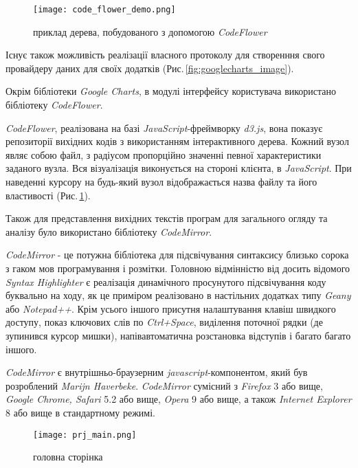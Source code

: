 \begin{figure}[h]
    \centering
    \texttt{[image: code\_flower\_demo.png]}
    \caption{приклад дерева, побудованого з допомогою {\it CodeFlower}}
    \label{fig:codeflower_demo_image}
\end{figure}

Існує також можливість реалізації власного протоколу для створенння свого провайдеру даних для своїх додатків (Рис.\,\ref{fig:googlecharts_image}).

Окрім бібліотеки {\itshape Google Charts}, в модулі інтерфейсу користувача використано бібліотеку {\itshape CodeFlower}.

{\itshape CodeFlower}, реалізована на базі {\itshape JavaScript}-фреймворку {\itshape d3.js}, вона показує репозиторії вихідних кодів з використанням інтерактивного дерева. Кожний вузол являє собою файл, з радіусом пропорційно значенні певної характеристики заданого вузла. Вся візуалізація виконується на стороні клієнта, в {\itshape JavaScript}. При наведенні курсору на будь-який вузол відображається назва файлу та його властивості (Рис.\,\ref{fig:codeflower_demo_image}).

Також для представлення вихідних текстів програм для загального огляду та аналізу було використано бібліотеку {\it CodeMirror}.

{\it CodeMirror} - це потужна бібліотека для підсвічування синтаксису близько сорока з гаком мов програмування і розмітки. Головною відмінністю від досить відомого {\it Syntax Highlighter} є реалізація динамічного просунутого підсвічування коду буквально на ходу, як це приміром реалізовано в настільних додатках типу {\it Geany} або {\it Notepad++}. Крім усього іншого присутня налаштування клавіш швидкого доступу, показ ключових слів по {\it Ctrl+Space}, виділення поточної рядки (де зупинився курсор мишки), напівавтоматична розстановка відступів і багато багато іншого.

{\it CodeMirror} є внутрішньо-браузерним {\it javascript}-компонентом, який був розроблений {\it Marijn Haverbeke}. {\it CodeMirror} сумісний з {\it Firefox} 3 або вище, {\it Google Chrome, Safari} 5.2 або вище, {\it Opera} 9 або вище, а також {\it Internet Explorer} 8 або вище в стандартному режимі.

\begin{figure}[h]
    \centering
    \texttt{[image: prj\_main.png]}
    \caption{головна сторінка}
    \label{fig:prj_main_image}
\end{figure}

